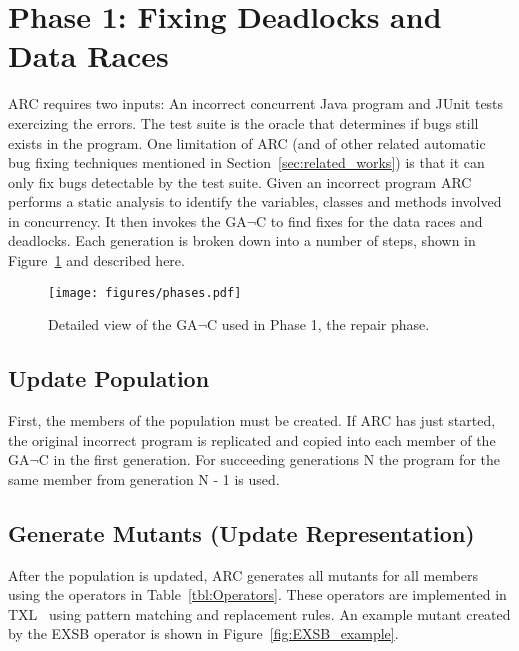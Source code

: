 \documentclass{llncs}
\begin{document}
\section{Phase 1: Fixing Deadlocks and Data Races}
\label{sec:Phase1Functional}

ARC requires two inputs: An incorrect concurrent Java program and JUnit tests exercizing the errors. The test suite is the oracle that determines if bugs still exists in the program. One limitation of ARC (and of other related automatic bug fixing techniques mentioned in Section~\ref{sec:related_works}) is that it can only fix bugs detectable by the test suite. Given an incorrect program ARC performs a static analysis to identify the variables, classes and methods involved in concurrency.  It then invokes the GA$\neg$C to find fixes for the data races and deadlocks.  Each generation is broken down into a number of steps, shown in Figure~\ref{fig:Phase1GAnotC} and described here.

\begin{figure}[t!]
  \centering
  \texttt{[image: figures/phases.pdf]}
  \caption{Detailed view of the GA$\neg$C used in Phase 1, the repair phase.}
  \label{fig:Phase1GAnotC}
\end{figure}

\subsection{Update Population}
\label{sec:UpdatePopulation}

First, the members of the population must be created.  If ARC has just started, the original incorrect program is replicated and copied into each member of the GA$\neg$C in the first generation.  For succeeding generations N the program for the same member from generation N - 1 is used. %

\subsection{Generate Mutants (Update Representation)}
\label{sec:GenerateMutants}

After the population is updated, ARC generates all mutants for all members using the operators in Table~\ref{tbl:Operators}.
These operators are implemented in  TXL~\cite{CHP91} using pattern matching and replacement rules. An example mutant created by the EXSB operator is shown in Figure~\ref{fig:EXSB_example}. 
\end{document}
